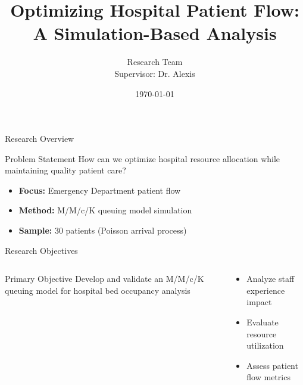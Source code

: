\documentclass[aspectratio=169]{beamer}  %
\title[Hospital Patient Flow Study]{Optimizing Hospital Patient Flow:\\A Simulation-Based Analysis}
\author[Research Team]{Research Team\\[0.3em]\small{Supervisor: Dr. Alexis}}
\institute[University]{Department of Healthcare Operations Research}
\date{\today}
\begin{document}
\begin{frame}
    \titlepage
\end{frame}

\begin{frame}{Research Overview}
    \begin{block}{Problem Statement}
        How can we optimize hospital resource allocation while maintaining quality patient care?
    \end{block}
    \vspace{0.5em}
    \begin{itemize}
        \item \textbf{Focus:} Emergency Department patient flow
        \item \textbf{Method:} M/M/c/K queuing model simulation
        \item \textbf{Sample:} 30 patients (Poisson arrival process)
    \end{itemize}
\end{frame}

\begin{frame}{Research Objectives}
    \begin{columns}[T]
        \begin{column}{0.48\textwidth}
            \begin{block}{Primary Objective}
                Develop and validate an M/M/c/K queuing model for hospital bed occupancy analysis
            \end{block}
        \end{column}
        \begin{column}{0.48\textwidth}
            \begin{itemize}
                \item Analyze staff experience impact
                \item Evaluate resource utilization
                \item Assess patient flow metrics
            \end{itemize}
        \end{column}
    \end{columns}
\end{frame}
\end{document}
